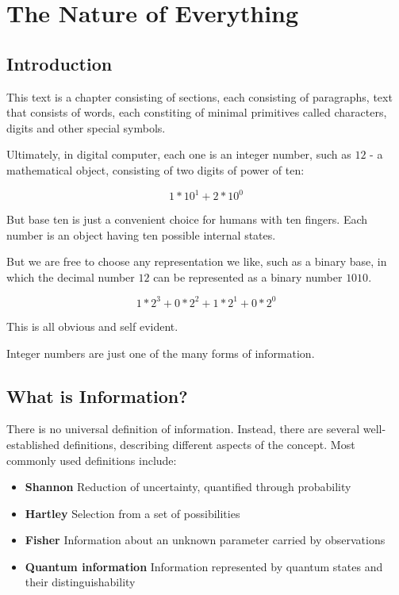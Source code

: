 \chapter{The Nature of Everything}

\section{Introduction}

This text is a chapter consisting of sections, each consisting of paragraphs, text that consists of 
words, each constiting of minimal primitives called characters, digits and other special symbols.

Ultimately, in digital computer, each one is an integer number, such as $12$ - a mathematical object,
consisting of two digits of power of ten:

\[
1 * 10^1 + 2 * 10^0
\]

But base ten is just a convenient choice for humans with ten fingers.
Each number is an object having ten possible internal states.

But we are free to choose any representation we like, such as a binary base, in which the decimal number $12$
can be represented as a binary number $1010$.

\[
1*2^3 + 0 * 2^2 + 1 * 2^1 + 0 * 2^0
\]

This is all obvious and self evident. 

Integer numbers are just one of the many forms of information. 


\section{What is Information?}

There is no universal definition of information. Instead, there are several well-established definitions,
describing different aspects of the concept. Most commonly used definitions include:

\begin{itemize}
\item \textbf{Shannon}	Reduction of uncertainty, quantified through probability
\item \textbf{Hartley}	Selection from a set of possibilities
\item \textbf{Fisher}	Information about an unknown parameter carried by observations
\item \textbf{Quantum information}	Information represented by quantum states and their distinguishability
\end{itemize}

